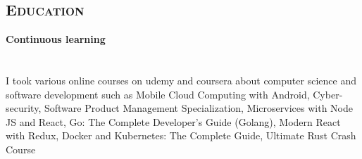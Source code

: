\begin{resume}
%
%
%
%
%
%
%


        \section{\textsc{Education}}

        \textbf{Continuous learning} \ \ \ \ \ \ \ \ \ \ \ \ \ \ \ \ \ \ \ \ \ \ \ \ \ \ \ \ \ \ \ \ \ \ \ \ \ \ \ \ \ \ \ \ \ \ \ \ \ \ \ \ \ \ \ \ \ \ \ \ \ \ \ \ \ \ \ \ \ \ \ \ \ \ \ \ \ \ \ \ \ \  \\
        I took various online courses on udemy and coursera about computer science and software development such as
        Mobile Cloud Computing with Android, %
        Cyber-security, %
        Software Product Management Specialization, %
        Microservices with Node JS and React,
        Go: The Complete Developer's Guide (Golang),
        Modern React with Redux,
        Docker and Kubernetes: The Complete Guide,
        Ultimate Rust Crash Course


\end{resume}
